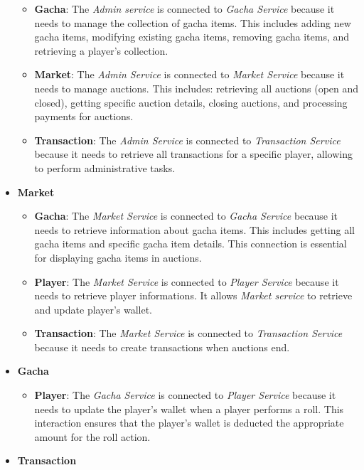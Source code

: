 \documentclass{article}
\begin{document}
\begin{itemize}
\begin{itemize}
              \item \textbf{Gacha}: The \emph{Admin service} is connected to \emph{Gacha Service} because it needs to manage the collection of gacha items. This includes adding new gacha items, modifying existing gacha items, removing gacha items, and retrieving a player's collection.
              \item \textbf{Market}: The \emph{Admin Service} is connected to \emph{Market Service} because it needs to manage auctions. This includes: retrieving all auctions (open and closed), getting specific auction details, closing auctions, and processing payments for auctions.
              \item \textbf{Transaction}: The \emph{Admin Service} is connected to \emph{Transaction Service} because it needs to retrieve all transactions for a specific player, allowing to perform administrative tasks.
          \end{itemize}
    \item \textbf{Market}
          \begin{itemize}
              \item \textbf{Gacha}: The \emph{Market Service} is connected to \emph{Gacha Service} because it needs to retrieve information about gacha items. This includes getting all gacha items and specific gacha item details. This connection is essential for displaying gacha items in auctions.
              \item \textbf{Player}: The \emph{Market Service} is connected to \emph{Player Service} because it needs to retrieve player informations. It allows  \emph{Market service} to retrieve and update player's wallet.
              \item \textbf{Transaction}: The \emph{Market Service} is connected to \emph{Transaction Service} because it needs to create transactions when auctions end.
          \end{itemize}
    \item \textbf{Gacha}
          \begin{itemize}
              \item \textbf{Player}: The \emph{Gacha Service} is connected to \emph{Player Service} because it needs to update the player's wallet when a player performs a roll. This interaction ensures that the player's wallet is deducted the appropriate amount for the roll action.
          \end{itemize}
    \item \textbf{Transaction}
          \begin{itemize}

\end{itemize}
\end{itemize}
\end{document}
